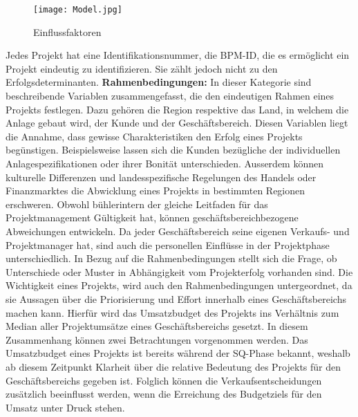 \documentclass[11pt]{article}
\begin{document}
\newline
\begin{figure}[ht!]
	\centering
	\texttt{[image: Model.jpg]}
	\caption{Einflussfaktoren \label{Einflussfaktoren}}
\end{figure}
\newline
Jedes Projekt hat eine Identifikationsnummer, die BPM-ID, die es ermöglicht ein Projekt eindeutig zu identifizieren. Sie zählt jedoch nicht zu den Erfolgsdeterminanten.
\newline
\newline\textbf{Rahmenbedingungen:} In dieser Kategorie sind beschreibende Variablen zusammengefasst, die den eindeutigen Rahmen eines Projekts festlegen. Dazu gehören die Region respektive das Land, in welchem die Anlage gebaut wird, der Kunde und der Geschäftsbereich. Diesen Variablen liegt die Annahme, dass gewisse Charakteristiken den Erfolg eines Projekts begünstigen. Beispielsweise lassen sich die Kunden bezügliche der individuellen Anlagespezifikationen oder ihrer Bonität unterschieden. Ausserdem können kulturelle Differenzen und landesspezifische Regelungen des Handels oder Finanzmarktes die Abwicklung eines Projekts in bestimmten Regionen erschweren. Obwohl bühlerintern der gleiche Leitfaden für das Projektmanagement Gültigkeit hat, können geschäftsbereichbezogene Abweichungen entwickeln. Da jeder Geschäftsbereich seine eigenen Verkaufs- und Projektmanager hat, sind auch die personellen Einflüsse in der Projektphase unterschiedlich. In Bezug auf die Rahmenbedingungen stellt sich die Frage, ob Unterschiede oder Muster in Abhängigkeit vom Projekterfolg vorhanden sind. Die Wichtigkeit eines Projekts, wird auch den Rahmenbedingungen untergeordnet, da sie Aussagen über die Priorisierung und Effort innerhalb eines Geschäftsbereichs machen kann. Hierfür wird das Umsatzbudget des Projekts ins Verhältnis zum Median aller Projektumsätze eines Geschäftsbereichs gesetzt. In diesem Zusammenhang können zwei Betrachtungen vorgenommen werden. Das Umsatzbudget eines Projekts ist bereits während der SQ-Phase bekannt, weshalb ab diesem Zeitpunkt Klarheit über die relative Bedeutung des Projekts für den Geschäftsbereichs gegeben ist. Folglich können die Verkaufsentscheidungen zusätzlich beeinflusst werden, wenn die Erreichung des Budgetziels für den Umsatz unter Druck stehen. 
\end{document}
